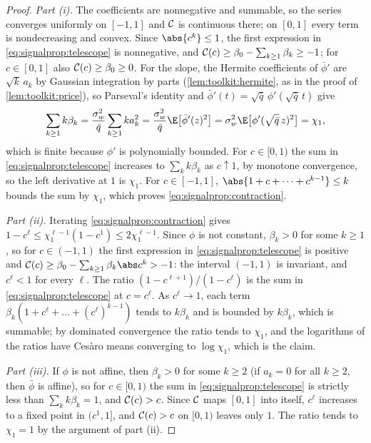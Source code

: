 \begin{refsection}
\begin{proof}
\emph{Part (i).} The coefficients are nonnegative and summable, so the series converges uniformly on $[-1,1]$ and $\mathcal{C}$ is continuous there; on $[0,1]$ every term is nondecreasing and convex. Since $\abs{c^k}\le1$, the first expression in \eqref{eq:signalprop:telescope} is nonnegative, and $\mathcal{C}(c)\ge\beta_0-\sum_{k\ge1}\beta_k\ge-1$; for $c\in[0,1]$ also $\mathcal{C}(c)\ge\beta_0\ge0$. For the slope, the Hermite coefficients of $\bar\phi'$ are $\sqrt{k}\,a_k$ by Gaussian integration by parts (\cref{lem:toolkit:hermite}, as in the proof of \cref{lem:toolkit:price}), so Parseval's identity and $\bar\phi'(t)=\sqrt{\bar q}\,\phi'(\sqrt{\bar q}\,t)$ give
\[
  \sum_{k\ge1}k\beta_k=\frac{\sigma_w^2}{\bar q}\sum_{k\ge1}ka_k^2=\frac{\sigma_w^2}{\bar q}\E\bigl[\bar\phi'(z)^2\bigr]=\sigma_w^2\E\bigl[\phi'(\sqrt{\bar q}\,z)^2\bigr]=\chi_1 ,
\]
which is finite because $\phi'$ is polynomially bounded. For $c\in[0,1)$ the sum in \eqref{eq:signalprop:telescope} increases to $\sum_kk\beta_k$ as $c\uparrow1$, by monotone convergence, so the left derivative at $1$ is $\chi_1$. For $c\in[-1,1]$, $\abs{1+c+\dots+c^{k-1}}\le k$ bounds the sum by $\chi_1$, which proves \eqref{eq:signalprop:contraction}.

\emph{Part (ii).} Iterating \eqref{eq:signalprop:contraction} gives $1-c^\ell\le\chi_1^{\ell-1}(1-c^1)\le2\chi_1^{\ell-1}$. Since $\phi$ is not constant, $\beta_k>0$ for some $k\ge1$, so for $c\in(-1,1)$ the first expression in \eqref{eq:signalprop:telescope} is positive and $\signalpropC(c)\ge\beta_0-\sum_{k\ge1}\beta_k\abs c^k>-1$: the interval $(-1,1)$ is invariant, and $c^\ell<1$ for every $\ell$. The ratio $(1-c^{\ell+1})/(1-c^\ell)$ is the sum in \eqref{eq:signalprop:telescope} at $c=c^\ell$. As $c^\ell\to1$, each term $\beta_k(1+c^\ell+\dots+(c^\ell)^{k-1})$ tends to $k\beta_k$ and is bounded by $k\beta_k$, which is summable; by dominated convergence the ratio tends to $\chi_1$, and the logarithms of the ratios have Ces\`aro means converging to $\log\chi_1$, which is the claim.

\emph{Part (iii).} If $\phi$ is not affine, then $\beta_k>0$ for some $k\ge2$ (if $a_k=0$ for all $k\ge2$, then $\bar\phi$ is affine), so for $c\in[0,1)$ the sum in \eqref{eq:signalprop:telescope} is strictly less than $\sum_kk\beta_k=1$, and $\mathcal{C}(c)>c$. Since $\mathcal{C}$ maps $[0,1]$ into itself, $c^\ell$ increases to a fixed point in $(c^1,1]$, and $\mathcal{C}(c)>c$ on $[0,1)$ leaves only $1$. The ratio tends to $\chi_1=1$ by the argument of part (ii).


\end{proof}
\end{refsection}
